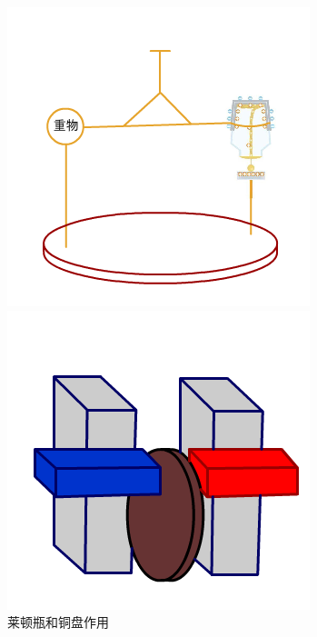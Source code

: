 \documentclass{CLGPY}
\begin{document}
\begin{multicols}{1}
        \begin{figure}[H]
            \centering
            \begin{minipage}{.47\linewidth}
                \centering
                \includegraphics[width=\linewidth]{./fig/20210615085951.png}
                \caption{莱顿瓶和铜盘作用\label{fig:Laton}}
            \end{minipage}
            \quad
            \begin{minipage}{.47\linewidth}
                \centering
                \includegraphics[width=\linewidth]{./fig/20210615090952.png}

\end{minipage}
\end{figure}
\end{multicols}
\end{document}

